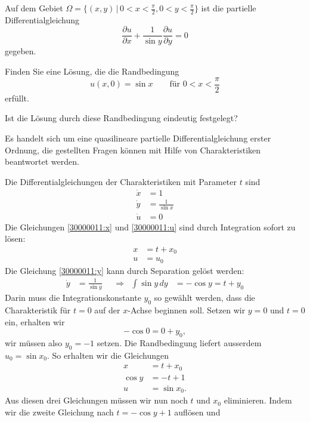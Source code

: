 Auf dem Gebiet $\Omega=\{(x,y)\,|\,0<x<\frac{\pi}2,0<y<\frac{\pi}2\}$
ist die partielle Differentialgleichung
\begin{equation}
\frac{\partial u}{\partial x}
+
\frac1{\sin y}\frac{\partial u}{\partial y}
=
0
\label{30000011:equation}
\end{equation}
gegeben.
\begin{teilaufgaben}
\item
Finden Sie eine Lösung, die die Randbedingung
\[
u(x,0)=\sin x\qquad \text{für $0<x<\frac{\pi}2$}
\]
erfüllt.
\item
Ist die Lösung durch diese Randbedingung eindeutig festgelegt?
\end{teilaufgaben}

\begin{loesung}
Es handelt sich um eine quasilineare partielle Differentialgleichung erster
Ordnung, die gestellten Fragen können mit Hilfe von Charakteristiken
beantwortet werden.
\begin{teilaufgaben}
\item
Die Differentialgleichungen der Charakteristiken mit Parameter $t$ sind
\begin{align}
\dot x&=1
\label{30000011:x}
\\
\dot y&=\frac1{\sin x}
\label{30000011:y}
\\
\dot u&=0
\label{30000011:u}
\end{align}
Die Gleichungen \eqref{30000011:x} und \eqref{30000011:u} sind durch
Integration sofort zu lösen:
\begin{align*}
x&=t+x_0\\
u&=u_0
\end{align*}
Die Gleichung \eqref{30000011:y} kann durch Separation gelöst werden:
\[
\begin{aligned}
\dot y&=\frac1{\sin y}
&&\Rightarrow&
\int \sin y\,dy&=-\cos y=t+y_0
\end{aligned}
\]
Darin muss die Integrationskonstante $y_0$ so gewählt werden,
dass die Charakteristik für $t=0$ auf der $x$-Achse beginnen soll.
Setzen wir $y=0$ und $t=0$ ein, erhalten wir
\[
-\cos 0=0+y_0,
\]
wir müssen also $y_0=-1$ setzen.
Die Randbedingung liefert ausserdem $u_0=\sin x_0$. So
erhalten wir die Gleichungen
\begin{align*}
x&=t+x_0\\
\cos y&=-t+1\\
u&=\sin x_0.
\end{align*}
Aus diesen drei Gleichungen müssen wir nun noch $t$ und $x_0$ eliminieren.
Indem wir die zweite Gleichung nach $t=-\cos y + 1$ auflösen und

\end{teilaufgaben}
\end{loesung}
